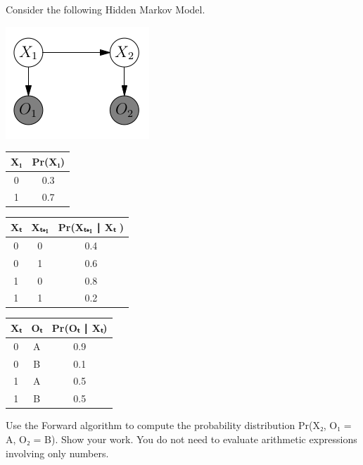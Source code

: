 \documentclass{article}
\begin{document}
\noindent Consider the following Hidden Markov Model.

\includegraphics[scale=0.5]{hmm.png}

\begin{tabular}{c|c}
X₁ & Pr(X₁)\tabularnewline
\midrule
0 & 0.3\tabularnewline
1 & 0.7\tabularnewline
  \end{tabular}
  \hfill
  \begin{tabular}{c|c|c}
Xₜ & Xₜ₊₁ & Pr(Xₜ₊₁ ∣ Xₜ )\tabularnewline
\midrule
0 & 0 & 0.4\tabularnewline
0 & 1 & 0.6\tabularnewline
        \midrule
1 & 0 & 0.8\tabularnewline
1 & 1 & 0.2\tabularnewline
  \end{tabular}
  \hfill
  \begin{tabular}{c|c|c}
Xₜ & Oₜ & Pr(Oₜ ∣ Xₜ)\tabularnewline
\midrule
0 & A & 0.9\tabularnewline
0 & B & 0.1\tabularnewline
        \midrule
1 & A & 0.5\tabularnewline
1 & B & 0.5\tabularnewline
  \end{tabular}
  \vskip5mm
\noindent Use the Forward algorithm to compute the probability distribution
Pr(X₂, O₁ = A, O₂ = B). Show your work. You do not need to evaluate arithmetic expressions involving only
numbers.
\end{document}

